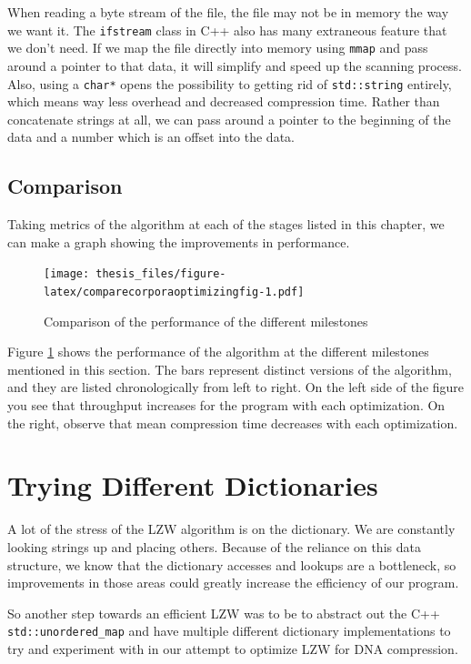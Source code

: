 \documentclass[12pt,twoside]{reedthesis}
\begin{document}
When reading a byte stream of the file, the file may not be in memory the way we want it. The \texttt{ifstream} class in C++ also has many extraneous feature that we don't need. If we map the file directly into memory using \texttt{mmap} and pass around a pointer to that data, it will simplify and speed up the scanning process. Also, using a \texttt{char*} opens the possibility to getting rid of \texttt{std::string} entirely, which means way less overhead and decreased compression time. Rather than concatenate strings at all, we can pass around a pointer to the beginning of the data and a number which is an offset into the data.

\hypertarget{comparison}{%
\subsection{Comparison}\label{comparison}}

Taking metrics of the algorithm at each of the stages listed in this chapter, we can make a graph showing the improvements in performance.
\begin{figure}
\centering
\texttt{[image: thesis\_files/figure-latex/comparecorporaoptimizingfig-1.pdf]}
\caption{\label{fig:comparecorporaoptimizingfig}Comparison of the performance of the different milestones}
\end{figure}
Figure \ref{fig:comparecorporaoptimizingfig} shows the performance of the algorithm at the different milestones mentioned in this section. The bars represent distinct versions of the algorithm, and they are listed chronologically from left to right. On the left side of the figure you see that throughput increases for the program with each optimization. On the right, observe that mean compression time decreases with each optimization.

\hypertarget{trying-different-dictionaries}{%
\section{Trying Different Dictionaries}\label{trying-different-dictionaries}}

A lot of the stress of the LZW algorithm is on the dictionary. We are constantly looking strings up and placing others. Because of the reliance on this data structure, we know that the dictionary accesses and lookups are a bottleneck, so improvements in those areas could greatly increase the efficiency of our program.

So another step towards an efficient LZW was to be to abstract out the C++ \texttt{std::unordered\_map} and have multiple different dictionary implementations to try and experiment with in our attempt to optimize LZW for DNA compression.
\end{document}
